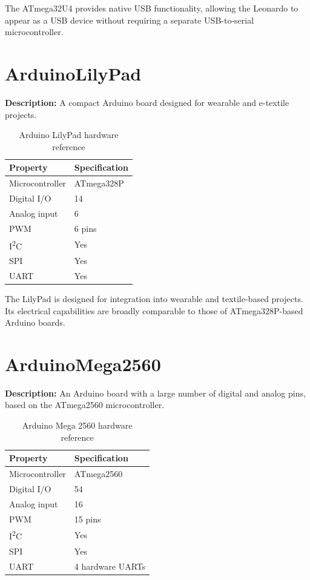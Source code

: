 The ATmega32U4 provides native USB functionality, allowing the Leonardo to
appear as a USB device without requiring a separate USB-to-serial
microcontroller.

\newpage
\section{ArduinoLilyPad}

\textbf{Description:} A compact Arduino board designed for wearable and
e-textile projects.

\begin{table}[H]
\centering
\caption{Arduino LilyPad hardware reference}
\label{tab:board-lilypad}
\begin{tabular}{ll}
\toprule
\textbf{Property} & \textbf{Specification} \\
\midrule
Microcontroller & ATmega328P \\
Digital I/O & 14 \\
Analog input & 6 \\
PWM & 6 pins \\
I\textsuperscript{2}C & Yes \\
SPI & Yes \\
UART & Yes \\
\bottomrule
\end{tabular}
\end{table}

The LilyPad is designed for integration into wearable and textile-based
projects. Its electrical capabilities are broadly comparable to those of
ATmega328P-based Arduino boards.

\section{ArduinoMega2560}

\textbf{Description:} An Arduino board with a large number of digital and
analog pins, based on the ATmega2560 microcontroller.

\begin{table}[H]
\centering
\caption{Arduino Mega 2560 hardware reference}
\label{tab:board-mega2560}
\begin{tabular}{ll}
\toprule
\textbf{Property} & \textbf{Specification} \\
\midrule
Microcontroller & ATmega2560 \\
Digital I/O & 54 \\
Analog input & 16 \\
PWM & 15 pins \\
I\textsuperscript{2}C & Yes \\
SPI & Yes \\
UART & 4 hardware UARTs \\
\bottomrule
\end{tabular}
\end{table}

